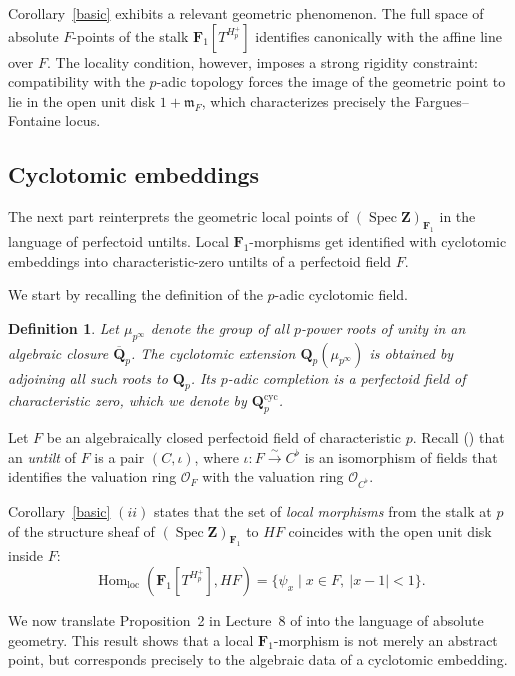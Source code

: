 \documentclass[11pt,a4paper]{article}
\newtheorem{definition}[theorem]{Definition}
\newcommand{\Q}{\mathbf{Q}}
\newcommand{\Z}{\mathbf{Z}}
\newcommand{\Fone}{\mathbf{F}_{1}}
\def\spzf{(\Spec \Z)_{\mathbf{F}_{1}}}
\newcommand{\Spec}{\operatorname{Spec}}
\begin{document}
Corollary~\ref{basic} exhibits a relevant geometric phenomenon. 
The full space of absolute $F$-points of the stalk
$
\Fone[T^{H_p^+}]
$
identifies canonically with the affine line over $F$. 
The locality condition, however, imposes a strong rigidity constraint: compatibility with the $p$-adic topology forces the image of the geometric point to lie in the open unit disk
$
1+\mathfrak m_F$, 
which characterizes precisely the Fargues--Fontaine locus.

\subsection{Cyclotomic embeddings}

The next part reinterprets the  geometric local points of $\spzf$ in the language of perfectoid untilts. Local $\Fone$-morphisms get identified with cyclotomic embeddings into characteristic-zero untilts of a perfectoid field $F$.\vspace{.03in}

We start by recalling the definition 
of the $p$-adic cyclotomic field.

\begin{definition}
Let $\mu_{p^\infty}$ denote the group of all 
$p$-power roots of unity in an algebraic closure 
$\overline{\Q}_p$. 
The cyclotomic extension 
$\Q_p(\mu_{p^\infty})$ 
is obtained by adjoining all such roots to $\Q_p$. 
Its $p$-adic completion is a perfectoid field 
of characteristic zero, which we denote by 
$\Q_p^{\mathrm{cyc}}$.
\end{definition}

Let $F$ be an algebraically closed perfectoid field 
of characteristic $p$. 
Recall (\cite{Scholze}) that an \emph{untilt} of $F$ 
is a pair $(C,\iota)$, where 
$\iota: F \xrightarrow{\sim} C^\flat$ 
is an isomorphism of fields that identifies 
the valuation ring $\mathcal O_F$ 
with the valuation ring $\mathcal O_{C^\flat}$.\vspace{.03in}

 Corollary~\ref{basic} $(ii)$ states that the set of \emph{local morphisms} 
from the stalk at $p$ of the structure sheaf of $\spzf$
to $HF$ coincides with the open unit disk inside $F$:
\[
\operatorname{Hom}_{\mathrm{loc}}
(\Fone[T^{H_p^+}], HF)
=
\{ \psi_x \mid x\in F,\ |x-1|<1 \}.
\]

We now translate Proposition~2 in 
 Lecture~8 of \cite{Lurie} 
into the language of absolute geometry. 
This result shows that a local $\Fone$-morphism 
is not merely an abstract point, but corresponds 
precisely to the algebraic data of a cyclotomic 
embedding.
\end{document}

